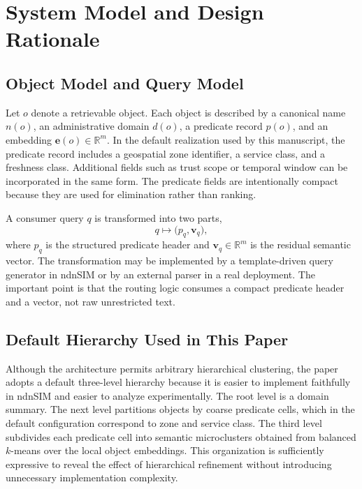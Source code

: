 \documentclass[journal]{IEEEtran}
\newcommand{\vect}[1]{\boldsymbol{#1}}
\begin{document}
\section{System Model and Design Rationale}

\subsection{Object Model and Query Model}

Let $o$ denote a retrievable object. Each object is described by a canonical name $n(o)$, an administrative domain $d(o)$, a predicate record $p(o)$, and an embedding $\vect{e}(o)\in\mathbb{R}^{m}$. In the default realization used by this manuscript, the predicate record includes a geospatial zone identifier, a service class, and a freshness class. Additional fields such as trust scope or temporal window can be incorporated in the same form. The predicate fields are intentionally compact because they are used for elimination rather than ranking.

A consumer query $q$ is transformed into two parts,
\begin{equation}
q \mapsto \bigl(p_q,\vect{v}_q\bigr),
\end{equation}
where $p_q$ is the structured predicate header and $\vect{v}_q\in\mathbb{R}^{m}$ is the residual semantic vector. The transformation may be implemented by a template-driven query generator in ndnSIM or by an external parser in a real deployment. The important point is that the routing logic consumes a compact predicate header and a vector, not raw unrestricted text.

\subsection{Default Hierarchy Used in This Paper}

Although the architecture permits arbitrary hierarchical clustering, the paper adopts a default three-level hierarchy because it is easier to implement faithfully in ndnSIM and easier to analyze experimentally. The root level is a domain summary. The next level partitions objects by coarse predicate cells, which in the default configuration correspond to zone and service class. The third level subdivides each predicate cell into semantic microclusters obtained from balanced $k$-means over the local object embeddings. This organization is sufficiently expressive to reveal the effect of hierarchical refinement without introducing unnecessary implementation complexity.
\end{document}
